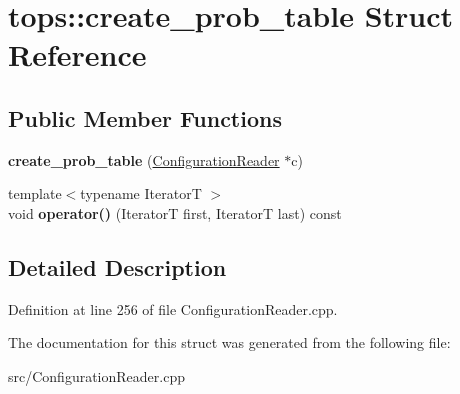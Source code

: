 \hypertarget{structtops_1_1create__prob__table}{}\section{tops\+:\+:create\+\_\+prob\+\_\+table Struct Reference}
\label{structtops_1_1create__prob__table}
\subsection*{Public Member Functions}
\begin{DoxyCompactItemize}
\item 
\mbox{\label{structtops_1_1create__prob__table_a417e1bc20845bdd438e2a10f66cd045a}} 
{\bfseries create\+\_\+prob\+\_\+table} (\hyperlink{classtops_1_1ConfigurationReader}{Configuration\+Reader} $\ast$c)
\item 
\mbox{\label{structtops_1_1create__prob__table_a537c0be2d62431b35ed02d72c3097166}} 
{\footnotesize template$<$typename IteratorT $>$ }\\void {\bfseries operator()} (IteratorT first, IteratorT last) const
\end{DoxyCompactItemize}


\subsection{Detailed Description}


Definition at line 256 of file Configuration\+Reader.\+cpp.



The documentation for this struct was generated from the following file\+:\begin{DoxyCompactItemize}
\item 
src/Configuration\+Reader.\+cpp\end{DoxyCompactItemize}
